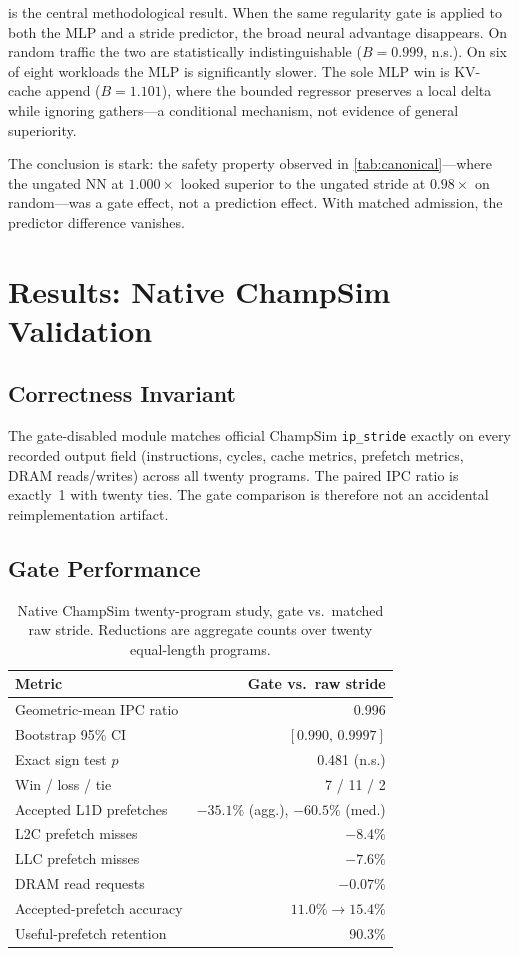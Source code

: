 \documentclass[conference]{IEEEtran}
\begin{document}
 is the central methodological result. When the same
regularity gate is applied to both the MLP and a stride predictor, the
broad neural advantage disappears. On random traffic the two are
statistically indistinguishable ($B = 0.999$, n.s.). On six of eight
workloads the MLP is significantly slower. The sole MLP win is KV-cache
append ($B = 1.101$), where the bounded regressor preserves a local delta
while ignoring gathers---a conditional mechanism, not evidence of general
superiority.

The conclusion is stark: the safety property observed in
\cref{tab:canonical}---where the ungated NN at $1.000\times$ looked
superior to the ungated stride at $0.98\times$ on random---was a gate
effect, not a prediction effect. With matched admission, the predictor
difference vanishes.

\section{Results: Native ChampSim Validation}
\label{sec:champsim}

\subsection{Correctness Invariant}

The gate-disabled module matches official ChampSim \texttt{ip\_stride}
exactly on every recorded output field (instructions, cycles, cache metrics,
prefetch metrics, DRAM reads/writes) across all twenty programs. The
paired IPC ratio is exactly~1 with twenty ties. The gate comparison is
therefore not an accidental reimplementation artifact.

\subsection{Gate Performance}

\begin{table}[t]
\centering
\caption{Native ChampSim twenty-program study, gate vs.\ matched raw stride.
Reductions are aggregate counts over twenty equal-length programs.}
\label{tab:champsim}
\begin{tabular}{@{}l r@{}}
\toprule
Metric & Gate vs.\ raw stride \\
\midrule
Geometric-mean IPC ratio & 0.996 \\
Bootstrap 95\% CI        & $[0.990,\,0.9997]$ \\
Exact sign test $p$      & 0.481 (n.s.) \\
Win / loss / tie         & 7 / 11 / 2 \\
Accepted L1D prefetches  & $-35.1\%$ (agg.), $-60.5\%$ (med.) \\
L2C prefetch misses      & $-8.4\%$ \\
LLC prefetch misses      & $-7.6\%$ \\
DRAM read requests       & $-0.07\%$ \\
Accepted-prefetch accuracy & $11.0\% \to 15.4\%$ \\
Useful-prefetch retention  & 90.3\% \\
\bottomrule
\end{tabular}
\end{table}
\end{document}
